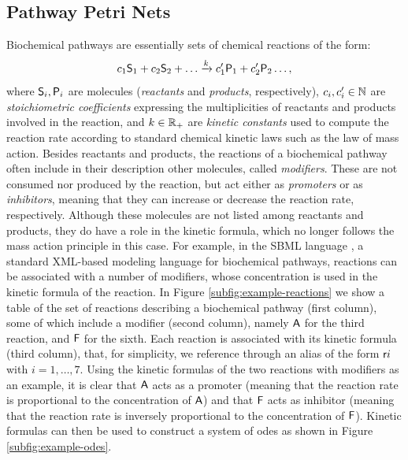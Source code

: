 \subsection{Pathway Petri Nets}\label{sec:ppn}
Biochemical pathways are essentially sets of chemical reactions of the form:
\[
c_1 \mathsf{S}_1 + c_2 \mathsf{S}_2 + \ldots
\xrightarrow{k}
c_1' \mathsf{P}_1 + c_2' \mathsf{P}_2 \ldots,
\]
where $\mathsf{S}_i,\mathsf{P}_i$ are molecules (\emph{reactants} and \emph{products}, respectively), $c_i, c_i' \in \mathbb{N}$ are \emph{stoichiometric coefficients} expressing the multiplicities of reactants and products involved in the reaction, and $k \in \mathbb{R}_{+}$ are \emph{kinetic constants} used to compute the reaction rate according to standard chemical kinetic laws such as the law of mass action. Besides reactants and products, the reactions of a biochemical pathway often include in their description other molecules, called \emph{modifiers}. These are not consumed nor produced by the reaction, but act either as \emph{promoters} or as \emph{inhibitors}, meaning that they can increase or decrease the reaction rate, respectively. Although these molecules are not listed among reactants and products, they do have a role in the kinetic formula, which no longer follows the mass action principle in this case. For example, in the SBML language \citep{hucka2018sbml}, a standard XML-based modeling language for biochemical pathways, reactions can be associated with a number of modifiers, whose concentration is used in the kinetic formula of the reaction. In Figure \ref{subfig:example-reactions} we show a table of the set of reactions describing a biochemical pathway (first column), some of which include a modifier (second column), namely $\mathsf{A}$ for the third reaction, and $\mathsf{F}$ for the sixth. Each reaction is associated with its kinetic formula (third column), that, for simplicity, we reference through an alias of the form $\mathsf{r}i$ with $i = 1, \ldots, 7$. Using the kinetic formulas of the two reactions with modifiers as an example, it is clear that $\mathsf{A}$ acts as a promoter (meaning that the reaction rate is proportional to the concentration of $\mathsf{A}$) and that $\mathsf{F}$ acts as inhibitor (meaning that the reaction rate is inversely proportional to the concentration of $\mathsf{F}$). Kinetic formulas can then be used to construct a system of \glspl{ode} as shown in Figure \ref{subfig:example-odes}.



